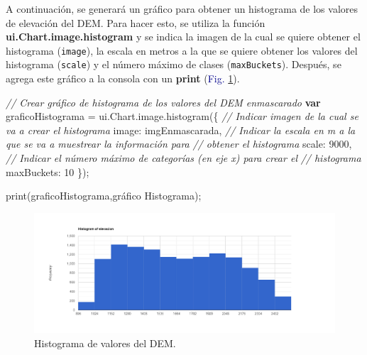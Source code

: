 \documentclass[
  12pt,
  letterpaper,
  twoside]{book}
\newenvironment{Shaded}{\begin{snugshade}}{\end{snugshade}}
\newcommand{\AttributeTok}[1]{\textcolor[rgb]{0.48,0.12,0.64}{#1}}
\newcommand{\CommentTok}[1]{\textcolor[rgb]{0.24,0.58,0.00}{\textit{#1}}}
\newcommand{\DataTypeTok}[1]{\textcolor[rgb]{0.00,0.00,0.00}{#1}}
\newcommand{\DecValTok}[1]{\textcolor[rgb]{0.28,0.53,0.93}{#1}}
\newcommand{\FunctionTok}[1]{\textcolor[rgb]{0.48,0.12,0.64}{#1}}
\newcommand{\KeywordTok}[1]{\textcolor[rgb]{0.00,0.00,0.00}{\textbf{#1}}}
\newcommand{\NormalTok}[1]{#1}
\newcommand{\OperatorTok}[1]{\textcolor[rgb]{0.00,0.00,0.00}{#1}}
\newcommand{\StringTok}[1]{\textcolor[rgb]{0.87,0.29,0.22}{#1}}
\newcommand\boldpurple[1]{\textcolor{darkpurple}{\textbf{#1}}}
\begin{document}
A continuación, se generará un gráfico para obtener un histograma de los valores de elevación del DEM. Para hacer esto, se utiliza la función \boldpurple{ui.Chart.image.histogram} y se indica la imagen de la cual se quiere obtener el histograma (\texttt{image}), la escala en metros a la que se quiere obtener los valores del histograma (\texttt{scale}) y el número máximo de clases (\texttt{maxBuckets}). Después, se agrega este gráfico a la consola con un \boldpurple{print} (\textcolor{darkblue}{Fig.} \ref{fig:f914}).

\begin{Shaded}
\begin{Highlighting}[]
\CommentTok{// Crear gráfico de histograma de los valores del DEM enmascarado}
\KeywordTok{var}\NormalTok{ graficoHistograma }\OperatorTok{=}\NormalTok{ ui}\OperatorTok{.}\AttributeTok{Chart}\OperatorTok{.}\AttributeTok{image}\OperatorTok{.}\FunctionTok{histogram}\NormalTok{(\{}
     \CommentTok{// Indicar imagen de la cual se va a crear el histograma  }
  \DataTypeTok{image}\OperatorTok{:}\NormalTok{ imgEnmascarada}\OperatorTok{,}
  \CommentTok{// Indicar la escala en m a la que se va a muestrear la información para  }
  \CommentTok{// obtener el histograma}
  \DataTypeTok{scale}\OperatorTok{:} \DecValTok{9000}\OperatorTok{,}
  \CommentTok{// Indicar el número máximo de categorías (en eje x) para crear el }
  \CommentTok{// histograma}
  \DataTypeTok{maxBuckets}\OperatorTok{:} \DecValTok{10}
\NormalTok{  \})}\OperatorTok{;}

\FunctionTok{print}\NormalTok{(graficoHistograma}\OperatorTok{,}\StringTok{\textquotesingle{}gráfico Histograma\textquotesingle{}}\NormalTok{)}\OperatorTok{;}
\end{Highlighting}
\end{Shaded}

\begin{figure}[H]

{\centering \includegraphics[width=0.95\linewidth]{Img/histElevacion} 

}

\caption{Histograma de valores del DEM.}\label{fig:f914}
\end{figure}
\end{document}

